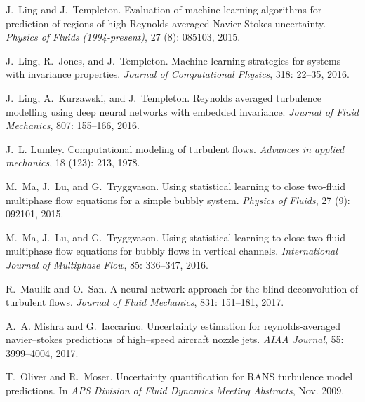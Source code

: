 \documentclass[a4paper]{ar-1col}
\begin{document}
\begin{thebibliography}{82}
J.~Ling and J.~Templeton.
\newblock Evaluation of machine learning algorithms for prediction of regions
  of high {Reynolds averaged Navier Stokes} uncertainty.
\newblock \emph{Physics of Fluids (1994-present)}, 27 (8):
  085103, 2015.

J.~Ling, R.~Jones, and J.~Templeton.
\newblock Machine learning strategies for systems with invariance properties.
\newblock \emph{Journal of Computational Physics}, 318: 22--35,
  2016{}.

J.~Ling, A.~Kurzawski, and J.~Templeton.
\newblock Reynolds averaged turbulence modelling using deep neural networks
  with embedded invariance.
\newblock \emph{Journal of Fluid Mechanics}, 807: 155--166,
  2016{}.

J.~L. Lumley.
\newblock Computational modeling of turbulent flows.
\newblock \emph{Advances in applied mechanics}, 18 (123):
  213, 1978.

M.~Ma, J.~Lu, and G.~Tryggvason.
\newblock Using statistical learning to close two-fluid multiphase flow
  equations for a simple bubbly system.
\newblock \emph{Physics of Fluids}, 27 (9): 092101, 2015.

M.~Ma, J.~Lu, and G.~Tryggvason.
\newblock Using statistical learning to close two-fluid multiphase flow
  equations for bubbly flows in vertical channels.
\newblock \emph{International Journal of Multiphase Flow}, 85:
  336--347, 2016.

R.~Maulik and O.~San.
\newblock A neural network approach for the blind deconvolution of turbulent
  flows.
\newblock \emph{Journal of Fluid Mechanics}, 831: 151--181, 2017.

A.~A. Mishra and G.~Iaccarino.
\newblock Uncertainty estimation for reynolds-averaged navier--stokes
  predictions of high--speed aircraft nozzle jets.
\newblock \emph{AIAA Journal}, 55: 3999--4004, 2017.

T.~Oliver and R.~Moser.
\newblock Uncertainty quantification for {RANS} turbulence model predictions.
\newblock In \emph{APS Division of Fluid Dynamics Meeting Abstracts}, Nov.
  2009.


\end{thebibliography}
\end{document}
